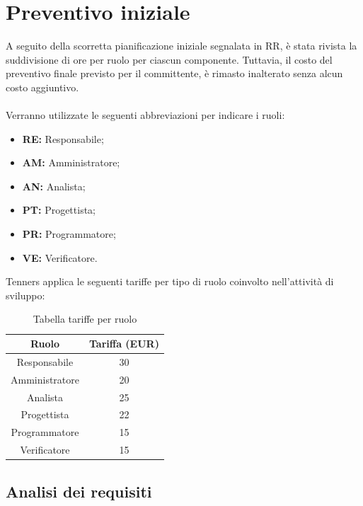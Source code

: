 \section{Preventivo iniziale}
A seguito della scorretta pianificazione iniziale segnalata in RR, è stata rivista la suddivisione di ore per ruolo per ciascun componente. Tuttavia, il costo del preventivo finale previsto per il committente, è rimasto inalterato senza alcun costo aggiuntivo.\\\\
Verranno utilizzate le seguenti abbreviazioni per indicare i ruoli:
\begin{itemize}
	\item \textbf{RE:} Responsabile;
	\item \textbf{AM:} Amministratore;
	\item \textbf{AN:} Analista;
	\item \textbf{PT:} Progettista;
	\item \textbf{PR:} Programmatore;
	\item \textbf{VE:} Verificatore.
\end{itemize}
Tenners applica le seguenti tariffe per tipo di ruolo coinvolto nell'attività di sviluppo:\\
\begin{table}[h]
\caption{Tabella tariffe per ruolo}
\begin{center}
\begin{tabular}{ |c|c|  }
 \hline
 Ruolo 		& Tariffa (EUR)\\
 \hline\hline
	Responsabile	& 30\\
	Amministratore	& 20\\
	Analista		& 25\\
	Progettista		& 22\\
	Programmatore	& 15\\
	Verificatore	& 15\\
 \hline
\end{tabular}
\end{center}
\end{table}
\newpage
\subsection{Analisi dei requisiti}
